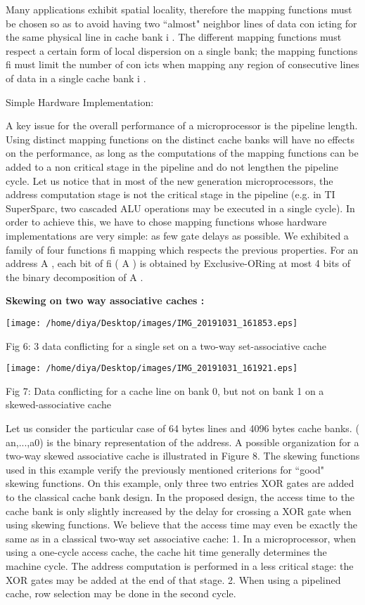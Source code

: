 \documentclass [ 12pt, letterpaper, twoside] {article}
\begin{document}
Many applications exhibit spatial locality, therefore the mapping functions must be chosen so as to avoid having two “almost" neighbor lines of data con icting for the same physical line in cache bank i .
The different mapping functions must respect a certain form of local dispersion on a single bank; the mapping functions fi must limit the number of con icts when mapping any region of consecutive lines of data in a single cache bank i .

Simple Hardware Implementation:

A key issue for the overall performance of a microprocessor is the pipeline length. Using distinct mapping functions on the distinct cache banks will have no effects on the performance, as long as the computations of the mapping functions can be added to a non critical stage in the pipeline and do not lengthen the pipeline cycle. Let us notice that in most of the new generation microprocessors, the address computation stage is not the critical stage in the pipeline (e.g. in TI SuperSparc, two cascaded ALU operations may be executed in a single cycle).
In order to achieve this, we have to chose mapping functions whose hardware implementations are very simple: as few gate delays as possible.
 We exhibited a family of four functions fi mapping which respects the previous properties. For
an address A , each bit of fi ( A ) is obtained by Exclusive-ORing at most 4 bits of the binary decomposition of A .

\textbf{\large Skewing on two way associative caches : }
 
\texttt{[image: /home/diya/Desktop/images/IMG\_20191031\_161853.eps]}

Fig 6: 3 data conflicting for a single set on a two-way set-associative cache 

\texttt{[image: /home/diya/Desktop/images/IMG\_20191031\_161921.eps]}

Fig 7: Data conflicting for a cache line on bank 0, but not on bank 1 on a skewed-associative cache

Let us consider the particular case of 64 bytes lines and 4096 bytes cache banks. ( an,...,a0) is the binary representation of the address. A possible organization for a two-way skewed associative cache is illustrated in Figure 8.
The skewing functions used in this example verify the previously mentioned criterions for “good" skewing functions.
On this example, only three two entries XOR gates are added to the classical cache bank design. In the proposed design, the access time to the cache bank is only slightly increased by the delay for crossing a XOR gate when using skewing functions.
We believe that the access time may even be exactly the same as in a classical two-way set associative cache:
1. In a microprocessor, when using a one-cycle access cache, the cache hit time generally determines the machine cycle. The address computation is performed in a less critical stage: the XOR gates may be added at the end of that stage.
2. When using a pipelined cache, row selection may be done in the second cycle.
\end{document}

